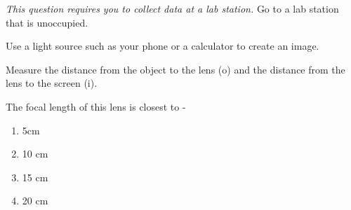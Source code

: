 \documentclass[10pt]{examdesign}
\begin{document}
\begin{shortanswer}[title={Lab Question (10 Points)}, rearrange=NO]
	
	

		\textit{This question requires you to collect data at a lab station.}  Go to a lab station that is unoccupied. \vspace{0.1in}
		
		Use a light source such as your phone or a calculator to create an image.  
		
		\vspace {0.1in} Measure the distance from the object to the lens (o) and the distance from the lens to the screen (i). 
		
	\begin{question}		The focal length of this lens is closest to - 
		\begin{enumerate}
			\item 5cm
			\item 10 cm
			\item 15 cm
			\item 20 cm
	
		\end{enumerate} 
		\vspace{2in}
	\end{question}
	
	
	
\end{shortanswer}
\end{document}

